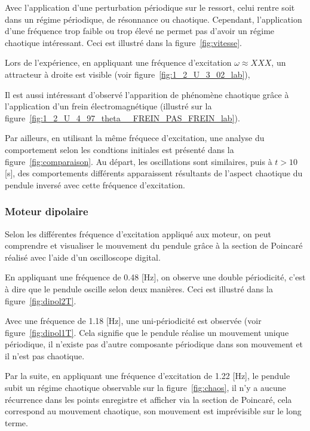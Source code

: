 \documentclass[a4paper,12pt,oneside]{article}
\begin{document}
Avec l'application d'une perturbation périodique sur le ressort, celui rentre soit dans un régime périodique, de résonnance ou chaotique. Cependant, l'application d'une fréquence trop faible ou trop élevé ne permet pas d'avoir un régime chaotique intéressant. Ceci est illustré dans la figure~\ref{fig:vitesse}.

Lors de l'expérience, en appliquant une fréquence d'excitation $\omega \approx XXX$, un attracteur à droite est visible (voir figure~\ref{fig:1_2_U_3_02_lab}), %

Il est aussi intéressant d'observé l'apparition de phénomène chaotique grâce à l'application d'un frein électromagnétique (illustré sur la figure~\ref{fig:1_2_U_4_97_theta__FREIN_PAS_FREIN_lab}). %

Par ailleurs, en utilisant la même fréquece d'excitation, une analyse du comportement selon les condtions initiales est présenté dans la figure~\ref{fig:comparaison}. Au départ, les oscillations sont similaires, puis à $t>10$ [s], des comportements différents apparaissent résultants de l'aspect chaotique du pendule inversé avec cette fréquence d'excitation. 

\subsubsection{Moteur dipolaire}

Selon les différentes fréquence d'excitation appliqué aux moteur, on peut comprendre et visualiser le mouvement du pendule grâce à la section de Poincaré réalisé avec l'aide d'un oscilloscope digital.

En appliquant une fréquence de 0.48 [Hz], on observe une double périodicité, c'est à dire que le pendule oscille selon deux manières.%
Ceci est illustré dans la figure~\ref{fig:dipol2T}.

Avec une fréquence de 1.18 [Hz], une uni-périodicité est observée (voir figure~\ref{fig:dipol1T}. Cela signifie que le pendule réalise un mouvement unique périodique, il n'existe pas d'autre composante périodique dans son mouvement et il n'est pas chaotique.

Par la suite, en appliquant une fréquence d'excitation de 1.22 [Hz], le pendule subit un régime chaotique observable sur la figure~\ref{fig:chaos}, il n'y a aucune récurrence dans les points enregistre et afficher via la section de Poincaré, cela correspond au mouvement chaotique, son mouvement est imprévisible sur le long terme.
\end{document}
